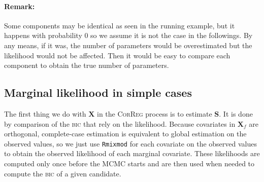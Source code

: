 \documentclass[12pt,a4paper]{report}
\begin{document}
\paragraph{Remark:} Some components may be identical as seen in the running example, but it happens with probability $0$ so we assume it is not the case in the followings. By any means, if it was, the number of parameters would be overestimated but the likelihood would not be affected. Then it would be easy to compare each component to obtain the true number of parameters.
\subsection{Marginal likelihood in simple cases}
The first thing we do with $\boldsymbol{X}$ in the \textsc{CorReg} process is to estimate $\boldsymbol{S}$. It is done by comparison of the \textsc{bic} that rely on the likelihood. Because covariates in $\boldsymbol{X}_f$ are orthogonal, complete-case estimation is equivalent to global estimation on the observed values, so we just use {\tt Rmixmod} for each covariate on the observed values to obtain the observed likelihood of each marginal covariate. These likelihoods are computed only once before the MCMC starts and are then used when needed to compute the \textsc{bic} of a given candidate.\\
\end{document}
